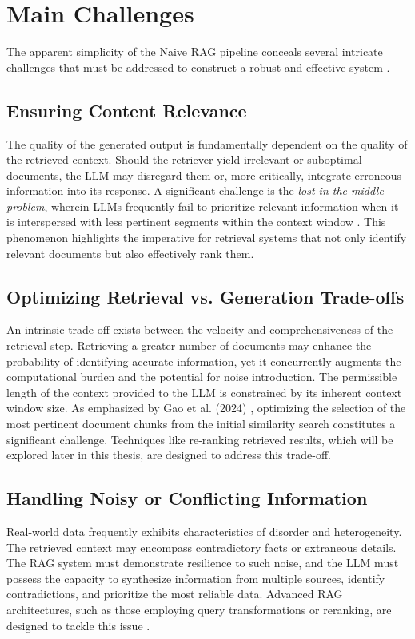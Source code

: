 \section{Main Challenges}
The apparent simplicity of the Naive RAG pipeline conceals several intricate challenges that must be addressed to construct a robust and effective system \autocite{gao2024retrievalaugmented}.

\subsection{Ensuring Content Relevance}
The quality of the generated output is fundamentally dependent on the quality of the retrieved context. Should the retriever yield irrelevant or suboptimal documents, the LLM may disregard them or, more critically, integrate erroneous information into its response. A significant challenge is the \textit{lost in the middle problem}, wherein LLMs frequently fail to prioritize relevant information when it is interspersed with less pertinent segments within the context window \autocite{liu2023lost}. This phenomenon highlights the imperative for retrieval systems that not only identify relevant documents but also effectively rank them.

\subsection{Optimizing Retrieval vs. Generation Trade-offs}
An intrinsic trade-off exists between the velocity and comprehensiveness of the retrieval step. Retrieving a greater number of documents may enhance the probability of identifying accurate information, yet it concurrently augments the computational burden and the potential for noise introduction. The permissible length of the context provided to the LLM is constrained by its inherent context window size. As emphasized by Gao et al. (2024) \autocite{gao2024retrievalaugmented}, optimizing the selection of the most pertinent document chunks from the initial similarity search constitutes a significant challenge. Techniques like re-ranking retrieved results, which will be explored later in this thesis, are designed to address this trade-off.

\subsection{Handling Noisy or Conflicting Information}
Real-world data frequently exhibits characteristics of disorder and heterogeneity. The retrieved context may encompass contradictory facts or extraneous details. The RAG system must demonstrate resilience to such noise, and the LLM must possess the capacity to synthesize information from multiple sources, identify contradictions, and prioritize the most reliable data. Advanced RAG architectures, such as those employing query transformations or reranking, are designed to tackle this issue \autocite{gao2024retrievalaugmented, rag_fusion_2024}.

